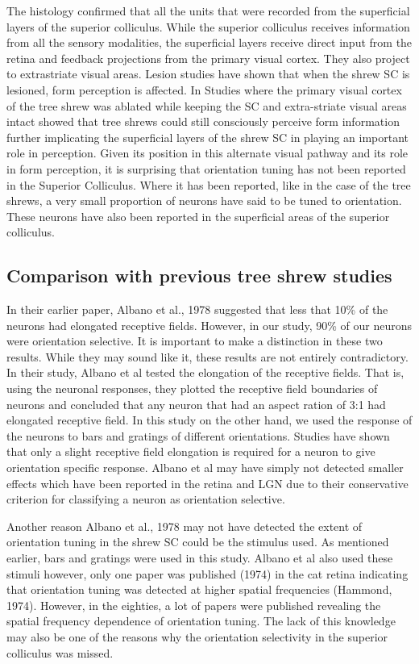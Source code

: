 		The histology confirmed that all the units that were recorded from the superficial layers of the superior colliculus. While the superior colliculus receives information from all the sensory modalities, the superficial layers receive direct input from the retina and feedback projections from the primary visual cortex. They also project to extrastriate visual areas. Lesion studies have shown that when the shrew SC is lesioned, form perception is affected. In Studies where the primary visual cortex of the tree shrew was ablated while keeping the SC and extra-striate visual areas intact showed that tree shrews could still consciously perceive form information further implicating the superficial layers of the shrew SC in playing an important role in perception. Given its position in this alternate visual pathway and its role in form perception, it is surprising that orientation tuning has not been reported in the Superior Colliculus. Where it has been reported, like in the case of the tree shrews, a very small proportion of neurons have said to be tuned to orientation. These neurons have also been reported in the superficial areas of the superior colliculus. 
		
		\subsection{Comparison with previous tree shrew studies}
		
		In their earlier paper, Albano et al., 1978 suggested that less that 10\% of the neurons had elongated receptive fields. However, in our study, 90\% of our neurons were orientation selective. It is important to make a distinction in these two results. While they may sound like it, these results are not entirely contradictory. In their study, Albano et al tested the elongation of the receptive fields. That is, using the neuronal responses, they plotted the receptive field boundaries of neurons and concluded that any neuron that had an aspect ration of 3:1 had elongated receptive field. In this study on the other hand, we used the response of the neurons to bars and gratings of different orientations. Studies have shown that only a slight receptive field elongation is required for a neuron to give orientation specific response. Albano et al may have simply not detected smaller effects which have been reported in the retina and LGN due to their conservative criterion for classifying a neuron as orientation selective.
		
		Another reason Albano et al., 1978 may not have detected the extent of orientation tuning in the shrew SC could be the stimulus used. As mentioned earlier, bars and gratings were used in this study. Albano et al also used these stimuli however, only one paper was published (1974) in the cat retina indicating that orientation tuning was detected at higher spatial frequencies (Hammond, 1974). However, in the eighties, a lot of papers were published revealing the spatial frequency dependence of orientation tuning. The lack of this knowledge may also be one of the reasons why the orientation selectivity in the superior colliculus was missed.
		
